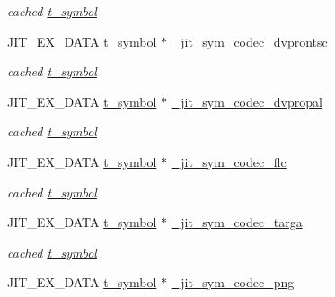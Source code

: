 \begin{DoxyCompactItemize}
\begin{DoxyCompactList}\small\item\em cached \hyperlink{structt__symbol}{t\_\-symbol} \item\end{DoxyCompactList}\item 
\hypertarget{group__jitter_ga3d1b9d4a079030cc6b8f11d1eb527eed}{
JIT\_\-EX\_\-DATA \hyperlink{structt__symbol}{t\_\-symbol} $\ast$ \hyperlink{group__jitter_ga3d1b9d4a079030cc6b8f11d1eb527eed}{\_\-jit\_\-sym\_\-codec\_\-dvprontsc}}
\label{group__jitter_ga3d1b9d4a079030cc6b8f11d1eb527eed}

\begin{DoxyCompactList}\small\item\em cached \hyperlink{structt__symbol}{t\_\-symbol} \item\end{DoxyCompactList}\item 
\hypertarget{group__jitter_gae850f6b0b73f74e4fec50e352b9361aa}{
JIT\_\-EX\_\-DATA \hyperlink{structt__symbol}{t\_\-symbol} $\ast$ \hyperlink{group__jitter_gae850f6b0b73f74e4fec50e352b9361aa}{\_\-jit\_\-sym\_\-codec\_\-dvpropal}}
\label{group__jitter_gae850f6b0b73f74e4fec50e352b9361aa}

\begin{DoxyCompactList}\small\item\em cached \hyperlink{structt__symbol}{t\_\-symbol} \item\end{DoxyCompactList}\item 
\hypertarget{group__jitter_ga2202e766cc46a9bfff9312c2e5660431}{
JIT\_\-EX\_\-DATA \hyperlink{structt__symbol}{t\_\-symbol} $\ast$ \hyperlink{group__jitter_ga2202e766cc46a9bfff9312c2e5660431}{\_\-jit\_\-sym\_\-codec\_\-flc}}
\label{group__jitter_ga2202e766cc46a9bfff9312c2e5660431}

\begin{DoxyCompactList}\small\item\em cached \hyperlink{structt__symbol}{t\_\-symbol} \item\end{DoxyCompactList}\item 
\hypertarget{group__jitter_ga5dc2290808fc905abbb1d804867d3a52}{
JIT\_\-EX\_\-DATA \hyperlink{structt__symbol}{t\_\-symbol} $\ast$ \hyperlink{group__jitter_ga5dc2290808fc905abbb1d804867d3a52}{\_\-jit\_\-sym\_\-codec\_\-targa}}
\label{group__jitter_ga5dc2290808fc905abbb1d804867d3a52}

\begin{DoxyCompactList}\small\item\em cached \hyperlink{structt__symbol}{t\_\-symbol} \item\end{DoxyCompactList}\item 
\hypertarget{group__jitter_ga8c27c5e836aa35a6522fcafddc1d8c2b}{
JIT\_\-EX\_\-DATA \hyperlink{structt__symbol}{t\_\-symbol} $\ast$ \hyperlink{group__jitter_ga8c27c5e836aa35a6522fcafddc1d8c2b}{\_\-jit\_\-sym\_\-codec\_\-png}}
\label{group__jitter_ga8c27c5e836aa35a6522fcafddc1d8c2b}


\end{DoxyCompactItemize}
